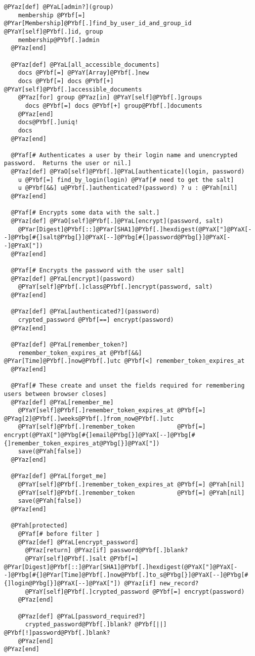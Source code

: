 \begin{Verbatim}[commandchars=@\[\]]
  @PYaz[def] @PYaL[admin?](group)
    membership @PYbf[=] @PYar[Membership]@PYbf[.]find_by_user_id_and_group_id @PYaY[self]@PYbf[.]id, group
    membership@PYbf[.]admin
  @PYaz[end]
  
  @PYaz[def] @PYaL[all_accessible_documents]
    docs @PYbf[=] @PYaY[Array]@PYbf[.]new
    docs @PYbf[=] docs @PYbf[+] @PYaY[self]@PYbf[.]accessible_documents
    @PYaz[for] group @PYaz[in] @PYaY[self]@PYbf[.]groups
      docs @PYbf[=] docs @PYbf[+] group@PYbf[.]documents
    @PYaz[end]
    docs@PYbf[.]uniq!
    docs
  @PYaz[end]
  
  @PYaf[# Authenticates a user by their login name and unencrypted password.  Returns the user or nil.]
  @PYaz[def] @PYaO[self]@PYbf[.]@PYaL[authenticate](login, password)
    u @PYbf[=] find_by_login(login) @PYaf[# need to get the salt]
    u @PYbf[&&] u@PYbf[.]authenticated?(password) ? u : @PYah[nil]
  @PYaz[end]

  @PYaf[# Encrypts some data with the salt.]
  @PYaz[def] @PYaO[self]@PYbf[.]@PYaL[encrypt](password, salt)
    @PYar[Digest]@PYbf[::]@PYar[SHA1]@PYbf[.]hexdigest(@PYaX["]@PYaX[--]@PYbg[#{]salt@PYbg[}]@PYaX[--]@PYbg[#{]password@PYbg[}]@PYaX[--]@PYaX["])
  @PYaz[end]

  @PYaf[# Encrypts the password with the user salt]
  @PYaz[def] @PYaL[encrypt](password)
    @PYaY[self]@PYbf[.]class@PYbf[.]encrypt(password, salt)
  @PYaz[end]

  @PYaz[def] @PYaL[authenticated?](password)
    crypted_password @PYbf[==] encrypt(password)
  @PYaz[end]

  @PYaz[def] @PYaL[remember_token?]
    remember_token_expires_at @PYbf[&&] @PYar[Time]@PYbf[.]now@PYbf[.]utc @PYbf[<] remember_token_expires_at 
  @PYaz[end]

  @PYaf[# These create and unset the fields required for remembering users between browser closes]
  @PYaz[def] @PYaL[remember_me]
    @PYaY[self]@PYbf[.]remember_token_expires_at @PYbf[=] @PYag[2]@PYbf[.]weeks@PYbf[.]from_now@PYbf[.]utc
    @PYaY[self]@PYbf[.]remember_token            @PYbf[=] encrypt(@PYaX["]@PYbg[#{]email@PYbg[}]@PYaX[--]@PYbg[#{]remember_token_expires_at@PYbg[}]@PYaX["])
    save(@PYah[false])
  @PYaz[end]

  @PYaz[def] @PYaL[forget_me]
    @PYaY[self]@PYbf[.]remember_token_expires_at @PYbf[=] @PYah[nil]
    @PYaY[self]@PYbf[.]remember_token            @PYbf[=] @PYah[nil]
    save(@PYah[false])
  @PYaz[end]

  @PYah[protected]
    @PYaf[# before filter ]
    @PYaz[def] @PYaL[encrypt_password]
      @PYaz[return] @PYaz[if] password@PYbf[.]blank?
      @PYaY[self]@PYbf[.]salt @PYbf[=] @PYar[Digest]@PYbf[::]@PYar[SHA1]@PYbf[.]hexdigest(@PYaX["]@PYaX[--]@PYbg[#{]@PYar[Time]@PYbf[.]now@PYbf[.]to_s@PYbg[}]@PYaX[--]@PYbg[#{]login@PYbg[}]@PYaX[--]@PYaX["]) @PYaz[if] new_record?
      @PYaY[self]@PYbf[.]crypted_password @PYbf[=] encrypt(password)
    @PYaz[end]
    
    @PYaz[def] @PYaL[password_required?]
      crypted_password@PYbf[.]blank? @PYbf[||] @PYbf[!]password@PYbf[.]blank?
    @PYaz[end]
@PYaz[end]
\end{Verbatim}


